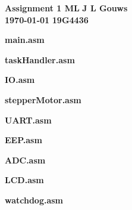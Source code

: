 \documentclass[a4paper,12pt]{article}
\newcommand\block[1]{\hspace*{#1}}
\begin{document}
\selectfont
\thispagestyle{empty}

{\Large \textbf{Assignment 1 ML}} \hfill {\Large \textbf{J L Gouws}}\\
\block{1.0cm} {\large \textbf{\today}} \hfill {\large \textbf{19G4436}}\\
\begin{center}
  \Large
  \textbf{
    main.asm
  }
\end{center}

\begin{center}
  \Large
  \textbf{
    taskHandler.asm
  }
\end{center}

\begin{center}
  \Large
  \textbf{
    IO.asm
  }
\end{center}

\begin{center}
  \Large
  \textbf{
    stepperMotor.asm
  }
\end{center}

\begin{center}
  \Large
  \textbf{
    UART.asm
  }
\end{center}

\begin{center}
  \Large
  \textbf{
    EEP.asm
  }
\end{center}

\begin{center}
  \Large
  \textbf{
    ADC.asm
  }
\end{center}

\begin{center}
  \Large
  \textbf{
    LCD.asm
  }
\end{center}

\begin{center}
  \Large
  \textbf{
    watchdog.asm
  }
\end{center}

\end{document}
